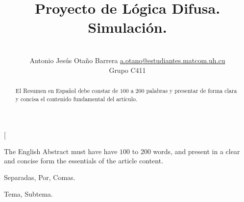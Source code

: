 \documentclass[a4paper,10pt,twocolumn]{article}
\title{Proyecto de Lógica Difusa. Simulación.}
\author{\\
\name Antonio Jesús Otaño Barrera \email \href{mailto:a.otano@estudiantes.matcom.uh.cu}{a.otano@estudiantes.matcom.uh.cu}
	\\ \addr Grupo C411}
\begin{document}
\twocolumn[

\maketitle


\begin{abstract}

	El Resumen en Español debe constar de $100$ a $200$ palabras y presentar de forma
	clara y concisa el contenido fundamental del artículo.

\end{abstract}

\vspace{0.5cm}

\begin{enabstract}

  The English Abstract must have have $100$ to $200$ words, and present in a clear
  and concise form the essentials of the article content.

\end{enabstract}

\begin{keywords}
	Separadas,
	Por,
	Comas.
\end{keywords}

\begin{topics}
	Tema, Subtema.
\end{topics}
\end{document}
